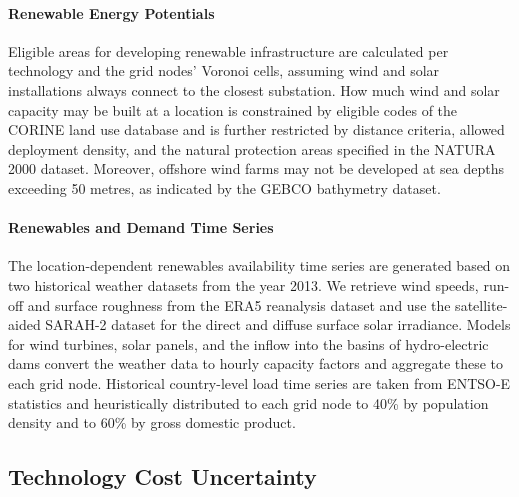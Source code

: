 
\paragraph{Renewable Energy Potentials}
Eligible areas for developing renewable infrastructure are calculated
per technology and the grid nodes' Voronoi cells, assuming wind and solar installations always connect to the closest substation. 
How much wind and solar capacity may be built at a location is constrained by
eligible codes of the CORINE land use database and is further restricted by distance criteria,
allowed deployment density, and the natural protection areas specified in the NATURA 2000 dataset.
Moreover, offshore wind farms may not be developed at sea depths exceeding 50 metres,
as indicated by the GEBCO bathymetry dataset. 


\paragraph{Renewables and Demand Time Series}
The location-dependent renewables availability time series are generated
based on two historical weather datasets from the year 2013.
We retrieve wind speeds, run-off and surface roughness from the ERA5 reanalysis dataset and
use the satellite-aided SARAH-2 dataset for the direct and diffuse surface solar irradiance.
Models for wind turbines, solar panels, and the inflow into the basins of hydro-electric dams
convert the weather data to hourly capacity factors and aggregate these to each grid node.
Historical country-level load time series are taken from ENTSO-E statistics and
heuristically distributed to each grid node to 40\% by population density and to 60\% by gross domestic product.

\subsection{Technology Cost Uncertainty}
\label{sec:uncertainty}


